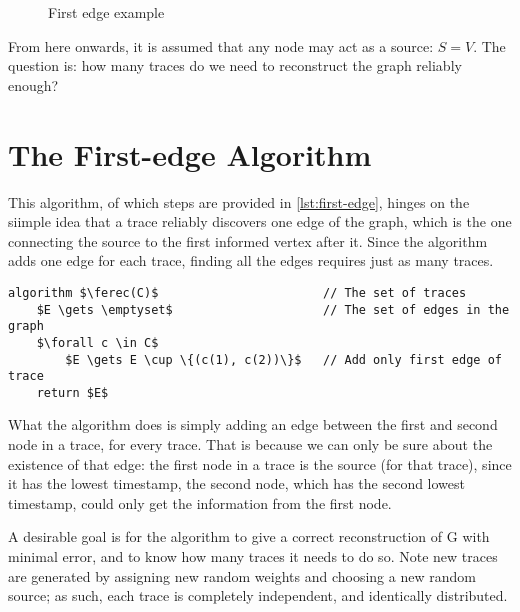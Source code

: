 \begin{figure}[ht]
    \centering
    \caption{First edge example}
    \label{fig:first-edge-ex}
\end{figure}

From here onwards, it is assumed that any node may act as a source: $S = V$. The question is: how many traces do we need to reconstruct the graph reliably enough?

\section{The First-edge Algorithm}
This algorithm, of which steps are provided in \ref{lst:first-edge}, hinges on the siimple idea that a trace reliably discovers one edge of the graph, which is the one connecting the source to the first informed vertex after it. Since the algorithm adds one edge for each trace, finding all the edges requires just as many traces.

\begin{lstlisting}[caption = {The First-edge algorithm}, label = {lst:first-edge}]
algorithm $\ferec(C)$                       // The set of traces
    $E \gets \emptyset$                     // The set of edges in the graph
    $\forall c \in C$
        $E \gets E \cup \{(c(1), c(2))\}$   // Add only first edge of trace
    return $E$
\end{lstlisting}

What the algorithm does is simply adding an edge between the first and second node in a trace, for every trace. That is because we can only be sure about the existence of that edge: the first node in a trace is the source (for that trace), since it has the lowest timestamp, the second node, which has the second lowest timestamp, could only get the information from the first node.

A desirable goal is for the algorithm to give a correct reconstruction of G with minimal error, and to know how many traces it needs to do so. Note new traces are generated by assigning new random weights and choosing a new random source; as such, each trace is completely independent, and identically distributed.

